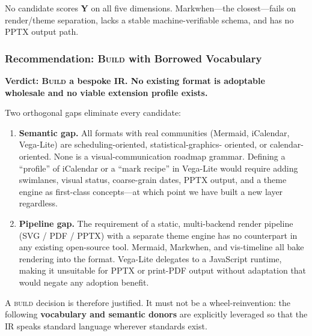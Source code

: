 No candidate scores \textbf{Y} on all five dimensions. Markwhen---the
closest---fails on render/theme separation, lacks a stable machine-verifiable
schema, and has no PPTX output path.

\subsubsection{Recommendation: \textsc{Build} with Borrowed Vocabulary}

\textbf{Verdict: \textsc{Build} a bespoke IR. No existing format is
adoptable wholesale and no viable extension profile exists.}

Two orthogonal gaps eliminate every candidate:

\begin{enumerate}
  \item \textbf{Semantic gap.} All formats with real communities (Mermaid,
        iCalendar, Vega-Lite) are scheduling-oriented, statistical-graphics-%
        oriented, or calendar-oriented. None is a visual-communication roadmap
        grammar. Defining a ``profile'' of iCalendar or a ``mark recipe'' in
        Vega-Lite would require adding swimlanes, visual status, coarse-grain
        dates, PPTX output, and a theme engine as first-class concepts---at
        which point we have built a new layer regardless.

  \item \textbf{Pipeline gap.} The requirement of a static, multi-backend
        render pipeline (SVG / PDF / PPTX) with a separate theme engine has no
        counterpart in any existing open-source tool. Mermaid, Markwhen, and
        vis-timeline all bake rendering into the format. Vega-Lite delegates to
        a JavaScript runtime, making it unsuitable for PPTX or print-PDF output
        without adaptation that would negate any adoption benefit.
\end{enumerate}

A \textsc{build} decision is therefore justified. It must not be a
wheel-reinvention: the following \textbf{vocabulary and semantic donors} are
explicitly leveraged so that the IR speaks standard language wherever standards
exist.

